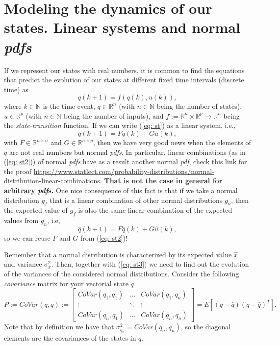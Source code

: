 \documentclass[11pt,a4paper]{article}
\begin{document}
\section{Modeling the dynamics of our states. Linear systems and normal \emph{pdfs}}
If we represent our states with real numbers, it is common to find the equations that predict the evolution of our states at different fixed time intervals (discrete time) as
\begin{equation}
	q(k+1) = f(q(k),u(k)),
	\label{eq: st}
\end{equation}
where $k\in\mathbb{N}$ is the time event, $q\in\mathbb{R}^n$ (with $n\in\mathbb{N}$ being the number of states), $u\in\mathbb{R}^p$ (with $n\in\mathbb{N}$ being the number of inputs), and $f := \mathbb{R}^n\times\mathbb{R}^p \to \mathbb{R}^n$ being the \emph{state-transition} function. If we can write (\ref{eq: st}) as a linear system, i.e.,
\begin{equation}
	q(k+1) = F q(k) + G u(k),
	\label{eq: st2}
\end{equation}
with $F\in\mathbb{R}^{n\times n}$ and $G\in\mathbb{R}^{n \times p}$, then we have very good news when the elements of $q$ are not real numbers but normal \emph{pdfs}. In particular, linear combinations (as in (\ref{eq: st2})) of normal \emph{pdfs} have as a result another normal \emph{pdf}, check this link for the proof \url{https://www.statlect.com/probability-distributions/normal-distribution-linear-combinations}. {\bf That is not the case in general for arbitrary \emph{pdf}s.} One nice consequence of this fact is that if we take a normal distribution $g_f$ that is a linear combination of other normal distributions $g_n$, then the expected value of $g_f$ is also the same linear combination of the expected values from $g_n$, i.e,
\begin{equation}
\hat q(k+1) = F \hat q(k) + G \hat u(k),
	\label{eq: st3}
\end{equation}
so we can reuse $F$ and $G$ from (\ref{eq: st2})!

Remember that a normal distribution is characterized by its expected value $\hat x$ and variance $\sigma_x^2$. Then, together with (\ref{eq: st3}) we need to find out the evolution of the variances of the considered normal distributions. Consider the following \emph{covariance} matrix for your vectorial state $q$
\begin{equation}
	P := CoVar(q,q) := \begin{bmatrix}
		CoVar(q_1,q_1) & \dots & CoVar(q_1,q_n) \\
		\vdots & \ddots & \vdots \\
		CoVar(q_n,q_1) & \dots & CoVar(q_n,q_n)
	\end{bmatrix} = E[(q-\hat q)(q-\hat q)^T].
\end{equation}
Note that by definition we have that $\sigma_{q_n}^2 = CoVar(q_n,q_n)$, so the diagonal elements are the covariances of the states in $q$.
\end{document}
